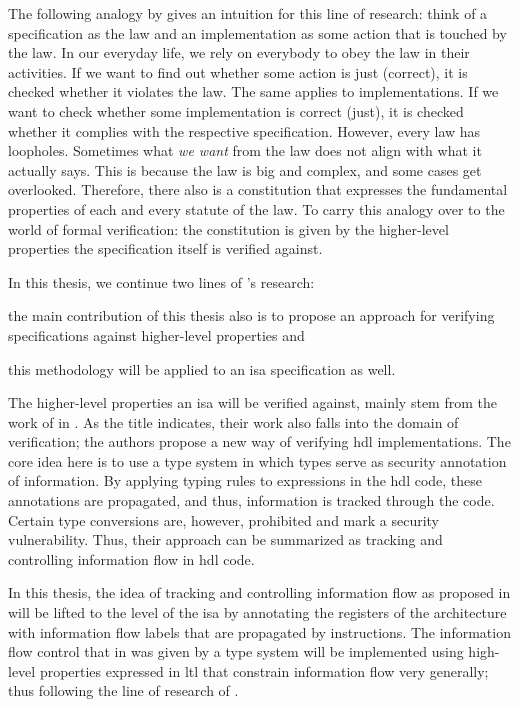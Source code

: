 The following analogy by \citeauthor{Reid17} gives an intuition for this line of research: think of a specification as the law and an implementation as some action that is touched by the law.
In our everyday life, we rely on everybody to obey the law in their activities.
If we want to find out whether some action is just (correct), it is checked whether it violates the law.
The same applies to implementations.
If we want to check whether some implementation is correct (just), it is checked whether it complies with the respective specification.
However, every law has loopholes.
Sometimes what \textit{we want} from the law does not align with what it actually says.
This is because the law is big and complex, and some cases get overlooked.
Therefore, there also is a constitution that expresses the fundamental properties of each and every statute of the law.
To carry this analogy over to the world of formal verification: the constitution is given by the higher-level properties the specification itself is verified against.

In this thesis, we continue two lines of \citeauthor{Reid17}'s research: \begin{enumerate*}[label=\alph*)]
    \item the main contribution of this thesis also is to propose an approach for verifying specifications against higher-level properties and
    \item this methodology will be applied to an \gls{isa} specification as well.
\end{enumerate*}

The higher-level properties an \gls{isa} will be verified against, mainly stem from the work of \citeauthor{Ferraiuolo17} in  \cite{Ferraiuolo17}.
As the title indicates, their work also falls into the domain of verification; the authors propose a new way of verifying \gls{hdl} implementations.
The core idea here is to use a type system in which types serve as security annotation of information.
By applying typing rules to expressions in the \gls{hdl} code, these annotations are propagated, and thus, information is tracked through the code.
Certain type conversions are, however, prohibited and mark a security vulnerability.
Thus, their approach can be summarized as tracking and controlling information flow in \gls{hdl} code.

In this thesis, the idea of tracking and controlling information flow as proposed in \cite{Ferraiuolo17} will be lifted to the level of the \gls{isa} by annotating the registers of the architecture with information flow labels that are propagated by instructions.
The information flow control that in \cite{Ferraiuolo17} was given by a type system will be implemented using high-level properties expressed in \gls{ltl} that constrain information flow very generally; thus following the line of research of \cite{Reid17}.

